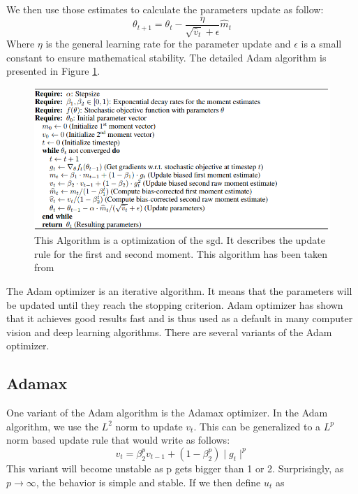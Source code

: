 We then use those estimates to calculate the parameters update as follow: 
\begin{equation}
    \theta_{t+1} = \theta_t - \frac{\eta}{\sqrt{\hat{v}_t} + \epsilon}\hat{m}_t
\end{equation}
Where \(\eta\) is the general learning rate for the parameter update and \(\epsilon\) is a small constant to ensure mathematical stability. 
The detailed  Adam algorithm is presented in Figure \ref{fig:adam_algo}.
\begin{figure}[!htp]
    \centering
        \includegraphics[width=1\textwidth]{figures/02-adam_algo}
        \caption[Adam Algorithm]{ This Algorithm is a optimization of the \gls{sgd}. It describes the update rule for the first and second moment. This algorithm has been taken from \cite{adam}}\label{fig:adam_algo}
\end{figure}
The Adam optimizer is an iterative algorithm. It means that the parameters will be updated until they reach the stopping criterion. 
Adam optimizer has shown that it achieves good results fast and is thus used as a default in many 
computer vision and deep learning algorithms. There are several variants of the Adam optimizer.

\subsection{Adamax}
One variant of the Adam algorithm is the Adamax optimizer. In the Adam algorithm, we use the \(L^2\) norm to update \(v_t\). This can be generalized to a \(L^p\) norm based update rule that would write as follows: 
\begin{equation}
    v_t = \beta_2^p v_{t-1} + (1 - \beta_2^p) \mid g_t\mid^p
\end{equation}
This variant will become unstable as p gets bigger than 1 or 2. Surprisingly, as \(p\to\infty\), the behavior is simple and stable. If we then define \(u_t\) as 

